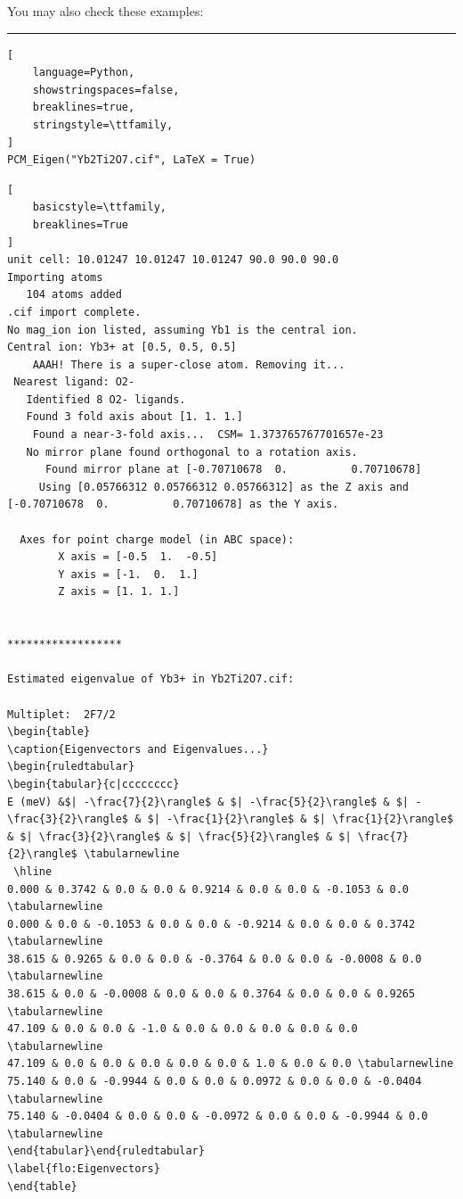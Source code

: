 \documentclass{article}
\begin{document}
You may also check these examples:
\hrule
\smallskip
{}
\begin{lstlisting}[
    language=Python, 
    showstringspaces=false, 
    breaklines=true,
    stringstyle=\ttfamily,
]
PCM_Eigen("Yb2Ti2O7.cif", LaTeX = True)
\end{lstlisting}
\begin{lstlisting}[
    basicstyle=\ttfamily,
    breaklines=True
]
unit cell: 10.01247 10.01247 10.01247 90.0 90.0 90.0
Importing atoms
   104 atoms added
.cif import complete.
No mag_ion ion listed, assuming Yb1 is the central ion.
Central ion: Yb3+ at [0.5, 0.5, 0.5]
    AAAH! There is a super-close atom. Removing it...
 Nearest ligand: O2-
   Identified 8 O2- ligands.
   Found 3 fold axis about [1. 1. 1.]
	Found a near-3-fold axis...  CSM= 1.373765767701657e-23
   No mirror plane found orthogonal to a rotation axis.
      Found mirror plane at [-0.70710678  0.          0.70710678] 
     Using [0.05766312 0.05766312 0.05766312] as the Z axis and [-0.70710678  0.          0.70710678] as the Y axis.

  Axes for point charge model (in ABC space):
        X axis = [-0.5  1.  -0.5] 
        Y axis = [-1.  0.  1.] 
        Z axis = [1. 1. 1.] 


******************

Estimated eigenvalue of Yb3+ in Yb2Ti2O7.cif:
 
Multiplet:  2F7/2
\begin{table}
\caption{Eigenvectors and Eigenvalues...}
\begin{ruledtabular}
\begin{tabular}{c|cccccccc}
E (meV) &$| -\frac{7}{2}\rangle$ & $| -\frac{5}{2}\rangle$ & $| -\frac{3}{2}\rangle$ & $| -\frac{1}{2}\rangle$ & $| \frac{1}{2}\rangle$ & $| \frac{3}{2}\rangle$ & $| \frac{5}{2}\rangle$ & $| \frac{7}{2}\rangle$ \tabularnewline
 \hline 
0.000 & 0.3742 & 0.0 & 0.0 & 0.9214 & 0.0 & 0.0 & -0.1053 & 0.0 \tabularnewline
0.000 & 0.0 & -0.1053 & 0.0 & 0.0 & -0.9214 & 0.0 & 0.0 & 0.3742 \tabularnewline
38.615 & 0.9265 & 0.0 & 0.0 & -0.3764 & 0.0 & 0.0 & -0.0008 & 0.0 \tabularnewline
38.615 & 0.0 & -0.0008 & 0.0 & 0.0 & 0.3764 & 0.0 & 0.0 & 0.9265 \tabularnewline
47.109 & 0.0 & 0.0 & -1.0 & 0.0 & 0.0 & 0.0 & 0.0 & 0.0 \tabularnewline
47.109 & 0.0 & 0.0 & 0.0 & 0.0 & 0.0 & 1.0 & 0.0 & 0.0 \tabularnewline
75.140 & 0.0 & -0.9944 & 0.0 & 0.0 & 0.0972 & 0.0 & 0.0 & -0.0404 \tabularnewline
75.140 & -0.0404 & 0.0 & 0.0 & -0.0972 & 0.0 & 0.0 & -0.9944 & 0.0 \tabularnewline
\end{tabular}\end{ruledtabular}
\label{flo:Eigenvectors}
\end{table}
 

\end{lstlisting}
\end{document}
